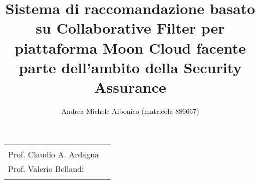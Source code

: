 \documentclass[10pt,a4paper]{article}
\begin{document}
    \title{\textbf{Sistema di raccomandazione basato su Collaborative Filter per piattaforma Moon Cloud
    facente parte dell'ambito della Security Assurance}}
    \author{Andrea Michele Albonico (matricola 886667)}
    \date{}

    \maketitle

    \vspace{0.5 cm}

    \begin{minipage}{\linewidth}
        \begin{tabular}{l r}
            \begin{minipage}[t]{.4\linewidth}
                \begin{flushleft}
                    {
                        RELATORE\\[.15cm]
                        Prof. Claudio A. Ardagna
                    }
                \end{flushleft}
            \end{minipage}
            &
            \begin{minipage}[t]{.53\linewidth}
                \begin{flushright}
                    {
                        CORRELATORE\\[.15cm]
                        Prof. Valerio Bellandi\\[.1cm]
                    }
                \end{flushright}
            \end{minipage}
        \end{tabular}
    \end{minipage}

    \vspace{2 cm}

\end{document}

